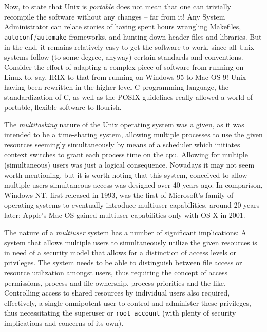 Now, to state that Unix is {\em portable} does not
mean that one can trivially recompile the software
without any changes -- far from it!  Any System
Administrator can relate stories of having spent
hours wrangling Makefiles, {\tt
autoconf}/{\tt automake} frameworks, and hunting down header files
and libraries.  But in the end, it remains
relatively easy to get the software to work, since all
Unix systems follow (to some degree, anyway) certain
standards and conventions.  Consider the effort of
adapting a complex piece of software from running on
Linux to, say, IRIX to that from running
on Windows 95 to Mac OS 9!  Unix having been rewritten
in the higher level C programming language, the
standardization of C, as well as the POSIX guidelines
really allowed a world of portable, flexible software
to flourish.

The {\em multitasking} nature of the Unix operating
system was a given, as it was intended to be a
time-sharing system, allowing multiple processes to
use the given resources seemingly simultaneously by
means of a scheduler which initiates context switches
to grant each process time on the
\gls{cpu}.  Allowing for multiple
(simultaneous) users was just a logical consequence.
Nowadays it may not seem worth mentioning, but it is
worth noting that this system, conceived to allow
multiple users simultaneous access was designed over
40 years ago.  In comparison, Windows NT, first released in 1993, was the first of
Microsoft's family of operating systems to eventually
introduce multiuser capabilities, around 20 years
later; Apple's Mac OS gained multiuser
capabilities only with OS X in 2001.

The nature of a {\em multiuser} system has a number of
significant implications:  A system that allows
multiple users to simultaneously utilize the given
resources is in need of a security model that allows
for a distinction of access levels or privileges.  The
system needs to be able to distinguish between file
access or resource utilization amongst users, thus
requiring the concept of access permissions, process
and file ownership, process priorities and the like.
Controlling access to shared resources by individual
users also required, effectively, a single omnipotent
user to control and administer these privileges, thus
necessitating the superuser or {\tt root
account} (with plenty of security
implications and concerns of its own).

